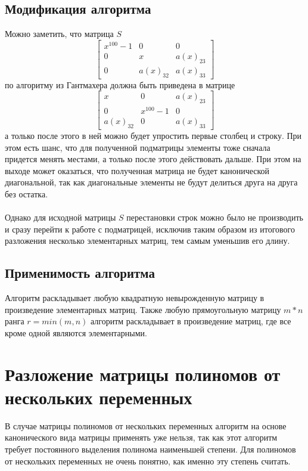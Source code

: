 \documentclass[14pt, a4paper]{extreport}
\begin{document}
	\section{Модификация алгоритма}
	Можно заметить, что матрица $S$
	\[
		\begin{bmatrix}
			x^{100} - 1 & 0 & 0 \\
			0 & x & a(x)_{23} \\
			0 & a(x)_{32} & a(x)_{33}
		\end{bmatrix}
	\]
	по алгоритму из Гантмахера должна быть приведена в матрице
	\[
		\begin{bmatrix}
			x & 0 & a(x)_{23} \\
			0 & x^{100} - 1 & 0 \\
			a(x)_{32} & 0 & a(x)_{33}
		\end{bmatrix}
	\]
	а только после этого в ней можно будет упростить первые столбец и строку. При
	этом есть шанс, что для полученной подматрицы элементы тоже сначала придется
	менять местами, а только после этого действовать дальше. При этом на выходе
	может оказаться, что полученная матрица не будет канонической диагональной, так
	как диагональные элементы не будут делиться друга на друга без остатка.\\\\
	Однако для исходной матрицы $S$ перестановки строк можно было не производить
	и сразу перейти к работе с подматрицей, исключив таким образом из итогового
	разложения несколько элементарных матриц, тем самым уменьшив его длину.
	\section{Применимость алгоритма}
		Алгоритм раскладывает любую квадратную невырожденную матрицу в произведение
		элементарных матриц. Также любую прямоугольную матрицу $m*n$ ранга $r=min(m,n)$
		алгоритм раскладывает в произведение матриц, где все кроме одной являются
		элементарными.
\chapter{Разложение матрицы полиномов от нескольких переменных}
	В случае матрицы полиномов от нескольких переменных алгоритм на основе канонического вида матрицы применять уже нельзя,
	так как этот алгоритм требует постоянного выделения полинома наименьшей степени. Для полиномов от нескольких
	переменных не очень понятно, как именно эту степень считать.
\end{document}
